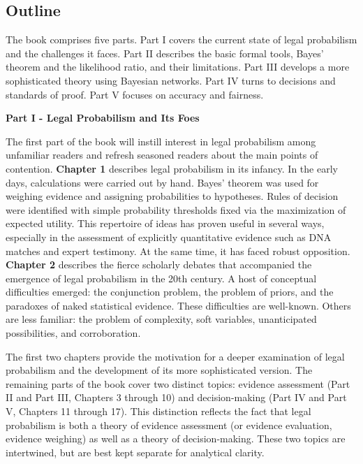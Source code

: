 \documentclass[
  10pt,
  dvipsnames,enabledeprecatedfontcommands]{scrartcl}
\begin{document}
\hypertarget{outline}{%
\subsection{Outline}\label{outline}}

The book comprises five parts. Part I covers the current state of legal
probabilism and the challenges it faces. Part II describes the basic
formal tools, Bayes' theorem and the likelihood ratio, and their
limitations. Part III develops a more sophisticated theory using
Bayesian networks. Part IV turns to decisions and standards of proof.
Part V focuses on accuracy and fairness.

\vspace{2mm}

\noindent \textbf{Part I - Legal Probabilism and Its Foes}

\noindent The first part of the book will instill interest in legal
probabilism among unfamiliar readers and refresh seasoned readers about
the main points of contention. \textbf{Chapter 1} describes legal
probabilism in its infancy. In the early days, calculations were carried
out by hand. Bayes' theorem was used for weighing evidence and assigning
probabilities to hypotheses. Rules of decision were identified with
simple probability thresholds fixed via the maximization of expected
utility. This repertoire of ideas has proven useful in several ways,
especially in the assessment of explicitly quantitative evidence such as
DNA matches and expert testimony. At the same time, it has faced robust
opposition. \textbf{Chapter 2} describes the fierce scholarly debates
that accompanied the emergence of legal probabilism in the 20th century.
A host of conceptual difficulties emerged: the conjunction problem, the
problem of priors, and the paradoxes of naked statistical evidence.
These difficulties are well-known. Others are less familiar: the problem
of complexity, soft variables, unanticipated possibilities, and
corroboration.

The first two chapters provide the motivation for a deeper examination
of legal probabilism and the development of its more sophisticated
version. The remaining parts of the book cover two distinct topics:
evidence assessment (Part II and Part III, Chapters 3 through 10) and
decision-making (Part IV and Part V, Chapters 11 through 17). This
distinction reflects the fact that legal probabilism is both a theory of
evidence assessment (or evidence evaluation, evidence weighing) as well
as a theory of decision-making. These two topics are intertwined, but
are best kept separate for analytical clarity.
\end{document}

